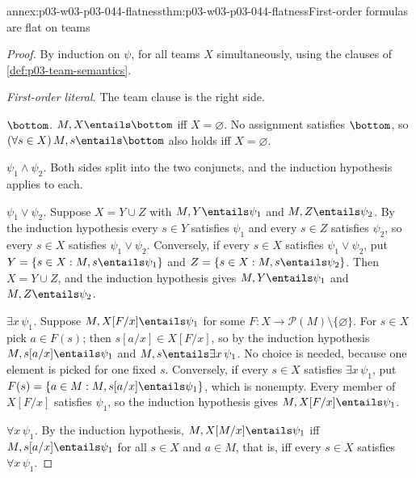 \begin{annexitem}{annex:p03-w03-p03-044-flatness}{thm:p03-w03-p03-044-flatness}{First-order formulas are flat on teams}
\begin{proof}
By induction on \(\psi\), for all teams \(X\) simultaneously, using the
clauses of \cref{def:p03-team-semantics}.

\emph{First-order literal.}  The team clause is the right side.

\emph{\(\bottom\).}  \(M,X\entails\bottom\) iff \(X=\varnothing\).  No
assignment satisfies \(\bottom\), so \((\forall s\in X)\,M,s\entails\bottom\)
also holds iff \(X=\varnothing\).

\emph{\(\psi_1\land\psi_2\).}  Both sides split into the two conjuncts, and
the induction hypothesis applies to each.

\emph{\(\psi_1\lor\psi_2\).}  Suppose \(X=Y\cup Z\) with
\(M,Y\entails\psi_1\) and \(M,Z\entails\psi_2\).  By the induction
hypothesis every \(s\in Y\) satisfies \(\psi_1\) and every \(s\in Z\)
satisfies \(\psi_2\), so every \(s\in X\) satisfies \(\psi_1\lor\psi_2\).
Conversely, if every \(s\in X\) satisfies \(\psi_1\lor\psi_2\), put
\(Y=\{s\in X:M,s\entails\psi_1\}\) and \(Z=\{s\in X:M,s\entails\psi_2\}\).
Then \(X=Y\cup Z\), and the induction hypothesis gives
\(M,Y\entails\psi_1\) and \(M,Z\entails\psi_2\).

\emph{\(\exists x\,\psi_1\).}  Suppose \(M,X[F/x]\entails\psi_1\) for some
\(F:X\to\mathcal P(M)\setminus\{\varnothing\}\).  For \(s\in X\) pick
\(a\in F(s)\); then \(s[a/x]\in X[F/x]\), so by the induction hypothesis
\(M,s[a/x]\entails\psi_1\) and \(M,s\entails\exists x\,\psi_1\).  No choice
is needed, because one element is picked for one fixed \(s\).  Conversely,
if every \(s\in X\) satisfies \(\exists x\,\psi_1\), put
\(F(s)=\{a\in M:M,s[a/x]\entails\psi_1\}\), which is nonempty.  Every member
of \(X[F/x]\) satisfies \(\psi_1\), so the induction hypothesis gives
\(M,X[F/x]\entails\psi_1\).

\emph{\(\forall x\,\psi_1\).}  By the induction hypothesis,
\(M,X[M/x]\entails\psi_1\) iff \(M,s[a/x]\entails\psi_1\) for all \(s\in X\)
and \(a\in M\), that is, iff every \(s\in X\) satisfies \(\forall x\,\psi_1\).
\end{proof}
\end{annexitem}

